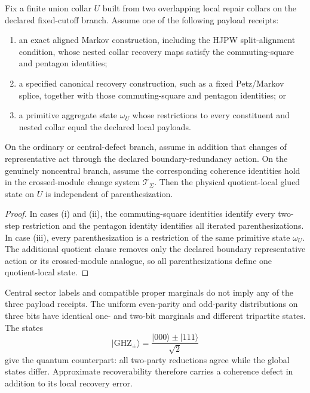 \begin{proposition}\label{prop:assocglue}
Fix a finite union collar \(U\) built from two overlapping local repair collars on the declared
fixed-cutoff branch. Assume one of the following payload receipts:
\begin{enumerate}[label=\textup{(\roman*)},leftmargin=2em]
\item an exact aligned Markov construction, including the HJPW split-alignment condition, whose
nested collar recovery maps satisfy the commuting-square and pentagon identities;
\item a specified canonical recovery construction, such as a fixed Petz/Markov splice, together
with those commuting-square and pentagon identities; or
\item a primitive aggregate state \(\omega_U\) whose restrictions to every constituent and nested
collar equal the declared local payloads.
\end{enumerate}
On the ordinary or central-defect branch, assume in addition that changes of representative act
through the declared boundary-redundancy action. On the genuinely noncentral branch, assume the
corresponding coherence identities hold in the crossed-module change system
\(\mathcal T_\Sigma\). Then the physical quotient-local glued state on \(U\) is independent of
parenthesization.
\end{proposition}

\begin{proof}
In cases \textup{(i)} and \textup{(ii)}, the commuting-square identities identify every two-step
restriction and the pentagon identity identifies all iterated parenthesizations. In case
\textup{(iii)}, every parenthesization is a restriction of the same primitive state
\(\omega_U\). The additional quotient clause removes only the declared boundary representative
action or its crossed-module analogue, so all parenthesizations define one quotient-local state.
\end{proof}

\begin{remark}
Central sector labels and compatible proper marginals do not imply any of the three payload
receipts. The uniform even-parity and odd-parity distributions on three bits have identical one-
and two-bit marginals and different tripartite states. The states
\[
|\mathrm{GHZ}_{\pm}\rangle
=
\frac{|000\rangle\pm|111\rangle}{\sqrt2}
\]
give the quantum counterpart: all two-party reductions agree while the global states differ.
Approximate recoverability therefore carries a coherence defect in addition to its local recovery
error.
\end{remark}


